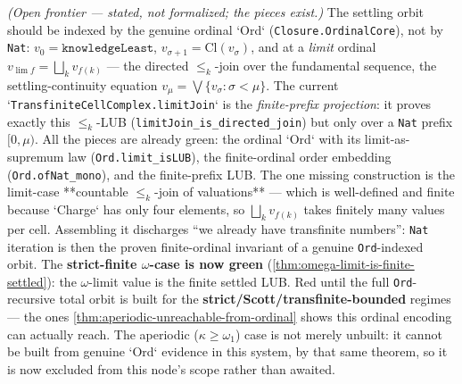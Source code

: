 \begin{theorem}\label{thm:ordinal-indexed-settling-orbit}\notready{}
\emph{(Open frontier --- stated, not formalized; the pieces exist.)} The settling orbit should be
indexed by the genuine ordinal `Ord` (\texttt{Closure.OrdinalCore}), not by \texttt{Nat}:
$v_0 = \texttt{knowledgeLeast}$, $v_{\sigma+1} = \mathrm{Cl}(v_\sigma)$, and at a \emph{limit}
ordinal $v_{\lim f} = \bigsqcup_k v_{f(k)}$ --- the directed $\le_k$-join over the fundamental
sequence, the settling-continuity equation $v_\mu = \bigvee\{v_\sigma : \sigma<\mu\}$.
The current `\texttt{TransfiniteCellComplex.limitJoin}` is the \emph{finite-prefix projection}: it
proves exactly this $\le_k$-LUB (\texttt{limitJoin\_is\_directed\_join}) but only over a
\texttt{Nat} prefix $[0,\mu)$. All the pieces are already green: the ordinal `Ord` with its
limit-as-supremum law (\texttt{Ord.limit\_isLUB}), the finite-ordinal order embedding
(\texttt{Ord.ofNat\_mono}), and the finite-prefix LUB. The one missing construction is the
limit-case **countable $\le_k$-join of valuations** --- which is well-defined and finite because
`Charge` has only four elements, so $\bigsqcup_k v_{f(k)}$ takes finitely many values per cell.
Assembling it discharges ``we already have transfinite numbers'': \texttt{Nat} iteration is then
the proven finite-ordinal invariant of a genuine \texttt{Ord}-indexed orbit. The
\textbf{strict-finite $\omega$-case is now green} (\cref{thm:omega-limit-is-finite-settled}): the
$\omega$-limit value is the finite settled LUB. Red until the full \texttt{Ord}-recursive total
orbit is built for the \textbf{strict/Scott/transfinite-bounded} regimes --- the ones
\cref{thm:aperiodic-unreachable-from-ordinal} shows this ordinal encoding can actually reach. The
aperiodic ($\kappa\ge\omega_1$) case is not merely unbuilt: it cannot be built from genuine `Ord`
evidence in this system, by that same theorem, so it is now excluded from this node's scope rather
than awaited.
\end{theorem}

